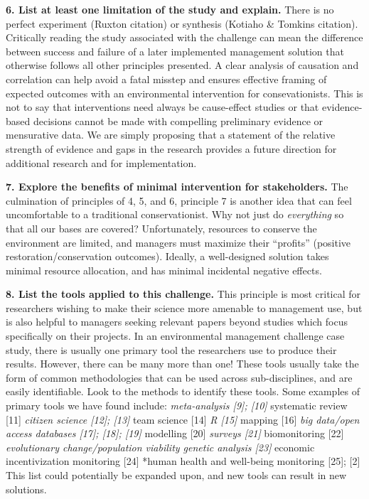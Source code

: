 \documentclass[10pt,letterpaper]{article}
\begin{document}
\textbf{6. List at least one limitation of the study and explain.} There
is no perfect experiment (Ruxton citation) or synthesis (Kotiaho \&
Tomkins citation). Critically reading the study associated with the
challenge can mean the difference between success and failure of a later
implemented management solution that otherwise follows all other
principles presented. A clear analysis of causation and correlation can
help avoid a fatal misstep and ensures effective framing of expected
outcomes with an environmental intervention for consevationists. This is
not to say that interventions need always be cause-effect studies or
that evidence-based decisions cannot be made with compelling preliminary
evidence or mensurative data. We are simply proposing that a statement
of the relative strength of evidence and gaps in the research provides a
future direction for additional research and for implementation.

\textbf{7. Explore the benefits of minimal intervention for
stakeholders.} The culmination of principles of 4, 5, and 6, principle 7
is another idea that can feel uncomfortable to a traditional
conservationist. Why not just do \emph{everything} so that all our bases
are covered? Unfortunately, resources to conserve the environment are
limited, and managers must maximize their ``profits'' (positive
restoration/conservation outcomes). Ideally, a well-designed solution
takes minimal resource allocation, and has minimal incidental negative
effects.

\textbf{8. List the tools applied to this challenge.} This principle is
most critical for researchers wishing to make their science more
amenable to management use, but is also helpful to managers seeking
relevant papers beyond studies which focus specifically on their
projects. In an environmental management challenge case study, there is
usually one primary tool the researchers use to produce their results.
However, there can be many more than one! These tools usually take the
form of common methodologies that can be used across sub-disciplines,
and are easily identifiable. Look to the methods to identify these
tools. Some examples of primary tools we have found include:
\emph{meta-analysis {[}9{]}; {[}10{]} }systematic review {[}11{]}
\emph{citizen science {[}12{]}; {[}13{]} }team science {[}14{]} \emph{R
{[}15{]} }mapping {[}16{]} \emph{big data/open access databases
{[}17{]}; {[}18{]}; {[}19{]} }modelling {[}20{]} \emph{surveys {[}21{]}
}biomonitoring {[}22{]} \emph{evolutionary change/population viability
genetic analysis {[}23{]} }economic incentivization monitoring {[}24{]}
*human health and well-being monitoring {[}25{]}; {[}2{]} This list
could potentially be expanded upon, and new tools can result in new
solutions.
\end{document}
